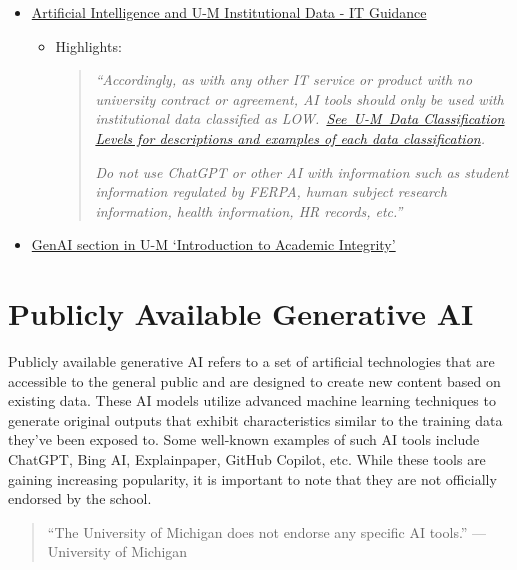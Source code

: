 \documentclass[
]{book}
\begin{document}
\begin{itemize}
\item
  \href{https://safecomputing.umich.edu/protect-the-u/safely-use-sensitive-data/AI-and-UM-Data}{Artificial Intelligence and U-M Institutional Data - IT Guidance}

  \begin{itemize}
  \item
    Highlights:

    \begin{quote}
    \emph{``Accordingly, as with any other IT service or product with no university contract or agreement, AI tools should only be used with institutional data classified as LOW.~\href{https://safecomputing.umich.edu/protect-the-u/safely-use-sensitive-data/classification-levels}{See~U-M~Data Classification Levels for descriptions and examples of each data classification}.}

    \emph{Do not use ChatGPT or other AI with information such as student information regulated by FERPA, human subject research information, health information, HR records, etc.''}
    \end{quote}
  \end{itemize}
\item
  \href{https://guides.lib.umich.edu/c.php?g=1039501\&p=9763907}{GenAI section in U-M `Introduction to Academic Integrity'}
\end{itemize}

\hypertarget{publicly-available-generative-ai}{%
\chapter{Publicly Available Generative AI}\label{publicly-available-generative-ai}}

Publicly available generative AI refers to a set of artificial technologies that are accessible to the general public and are designed to create new content based on existing data. These AI models utilize advanced machine learning techniques to generate original outputs that exhibit characteristics similar to the training data they've been exposed to. Some well-known examples of such AI tools include ChatGPT, Bing AI, Explainpaper, GitHub Copilot, etc. While these tools are gaining increasing popularity, it is important to note that they are not officially endorsed by the school.

\begin{quote}
``The University of Michigan does not endorse any specific AI tools.'' --- University of Michigan
\end{quote}
\end{document}
